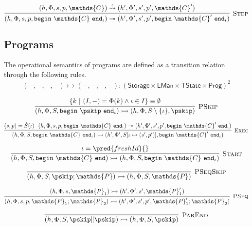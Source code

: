 \[
\infer[\textsc{Step}]
{
	(h, \Phi, s, p, \mathtt{begin}\ \mathds{C}\ \mathtt{end}_\iota)
	\twoheadrightarrow
	(h', \Phi', s', p', \mathtt{begin}\ \mathds{C}'\ \mathtt{end}_\iota)
}
{
	(h, \Phi, s, p, \mathds{C})
	\overset{\iota}{\rightsquigarrow}
	(h', \Phi', s', p', \mathds{C}')
}
\]

\subsection{Programs}


The operational semantics of programs are defined as a transition relation through the following rules.
\begin{gather*}
(-, -, -, -) \rightarrowtail (-, -, -, -) 
: (\mathsf{Storage} \times \mathsf{LMan} \times \mathsf{TState} \times \mathsf{Prog})^2
\end{gather*}

\[
\infer[\textsc{PSkip}]
{
	 (h, \Phi, S, \mathtt{begin}\ \pskip\ \mathtt{end}_\iota)
	\rightarrowtail
	(h, \Phi, S \setminus \{\iota\}, \pskip)
}
{
	\{ k\ |\ (I, -) = \Phi(k) \land \iota \in I \} \equiv \emptyset
}
\]

\[
\infer[\textsc{Exec}]
{
	 (h, \Phi, S, \mathtt{begin}\ \mathds{C}\ \mathtt{end}_\iota)
	\rightarrowtail
	(h', \Phi', S[\iota \mapsto (s', p')], \mathtt{begin}\ \mathds{C}'\ \mathtt{end}_\iota)
}
{
	(s, p) = \hat{S}(\iota)\ \
	(h, \Phi, s, p, \mathtt{begin}\ \mathds{C}\ \mathtt{end}_\iota)
	\twoheadrightarrow
	(h', \Phi', s', p', \mathtt{begin}\ \mathds{C}'\ \mathtt{end}_\iota)
}
\]

\[
\infer[\textsc{Start}]
{
	(h, \Phi, S, \mathtt{begin}\ \mathds{C}\ \mathtt{end})
	\rightarrowtail
	(h, \Phi, S, \mathtt{begin}\ \mathds{C}\ \mathtt{end}_\iota)
}
{
	\iota = \pred{freshId}{}
}
\]

\[
\infer[\textsc{PSeqSkip}]
{
	 (h, \Phi, S, \pskip; \mathds{P})
	\rightarrowtail
	(h, \Phi, S, \mathds{P})
}
{}
\]

\[
\infer[\textsc{PSeq}]
{
	 (h, \Phi, s, p, \mathds{P}_1; \mathds{P}_2)
	\rightarrowtail
	(h', \Phi', s', p', \mathds{P}_1'; \mathds{P}_2)
}
{
	 (h, \Phi, s, \mathds{P}_1)
	\rightarrowtail
	(h', \Phi', s', \mathds{P}_1')
}
\]

\[
\infer[\textsc{ParEnd}]
{
	 (h, \Phi, S, \pskip \| \pskip)
	\rightarrowtail
	(h, \Phi, S, \pskip)
}
{}
\]


